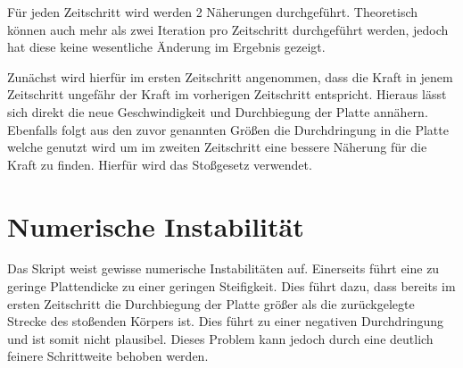 Für jeden Zeitschritt wird werden 2 Näherungen durchgeführt. Theoretisch können auch mehr als zwei Iteration pro Zeitschritt durchgeführt werden, jedoch hat diese keine wesentliche Änderung im Ergebnis gezeigt.

Zunächst wird hierfür im ersten Zeitschritt angenommen, dass die Kraft in jenem Zeitschritt ungefähr der Kraft im vorherigen Zeitschritt entspricht. Hieraus lässt sich direkt die neue Geschwindigkeit und Durchbiegung der Platte annähern. Ebenfalls folgt aus den zuvor genannten Größen die Durchdringung in die Platte welche genutzt wird um im zweiten Zeitschritt eine bessere Näherung für die Kraft zu finden. Hierfür wird das Stoßgesetz verwendet.

\section{Numerische Instabilität}

Das Skript weist gewisse numerische Instabilitäten auf. Einerseits führt eine zu geringe Plattendicke zu einer geringen Steifigkeit. Dies führt dazu, dass bereits im ersten Zeitschritt die Durchbiegung der Platte größer als die zurückgelegte Strecke des stoßenden Körpers ist. Dies führt zu einer negativen Durchdringung und ist somit nicht plausibel. Dieses Problem kann jedoch durch eine deutlich feinere Schrittweite behoben werden.






